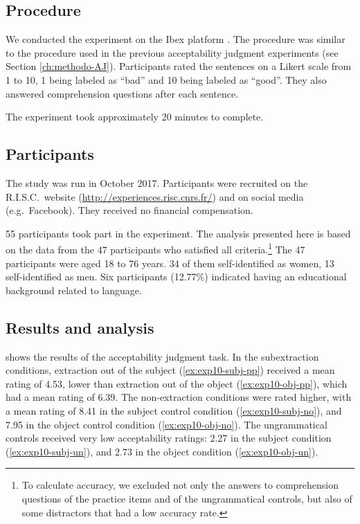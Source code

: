 \subsection{Procedure} 

We conducted the experiment on the Ibex platform \citep{Ibex}. The procedure was similar to the procedure used in the previous acceptability judgment experiments (see Section \ref{ch:methodo-AJ}). Participants rated the sentences on a Likert scale from 1 to 10, 1 being labeled as ``bad'' and 10 being labeled as ``good''. They also answered comprehension questions after each sentence.

The experiment took approximately 20 minutes to complete. 

\subsection{Participants}

The study was run in October 2017. 
Participants were recruited on the R.I.S.C.\ website (\url{http://experiences.risc.cnrs.fr/}) and on social media (e.g.\ Facebook).
They received no financial compensation.

55 participants took part in the experiment. The analysis presented here is based on the data from the 47 participants who satisfied all criteria.\footnote{To calculate accuracy, we excluded not only the answers to comprehension questions of the practice items and of the ungrammatical controls, but also of some distractors that had a low accuracy rate.}
The 47 participants were aged 18 to 76 years. 34 of them self-identified as women, 13 self-identified as men. Six participants (12.77\%) indicated having an educational background related to language.

\subsection{Results and analysis}

 shows the results of the acceptability judgment task.
In the subextraction conditions, extraction out of the subject (\ref{ex:exp10-subj-pp}) received a mean rating of 4.53, lower than extraction out of the object (\ref{ex:exp10-obj-pp}), which had a mean rating of 6.39. The non-extraction conditions were rated higher, with a mean rating of 8.41 in the subject control condition (\ref{ex:exp10-subj-no}), and 7.95 in the object control condition (\ref{ex:exp10-obj-no}). The ungrammatical controls received very low acceptability ratings: 2.27 in the subject condition (\ref{ex:exp10-subj-un}), and 2.73 in the object condition (\ref{ex:exp10-obj-un}). 

